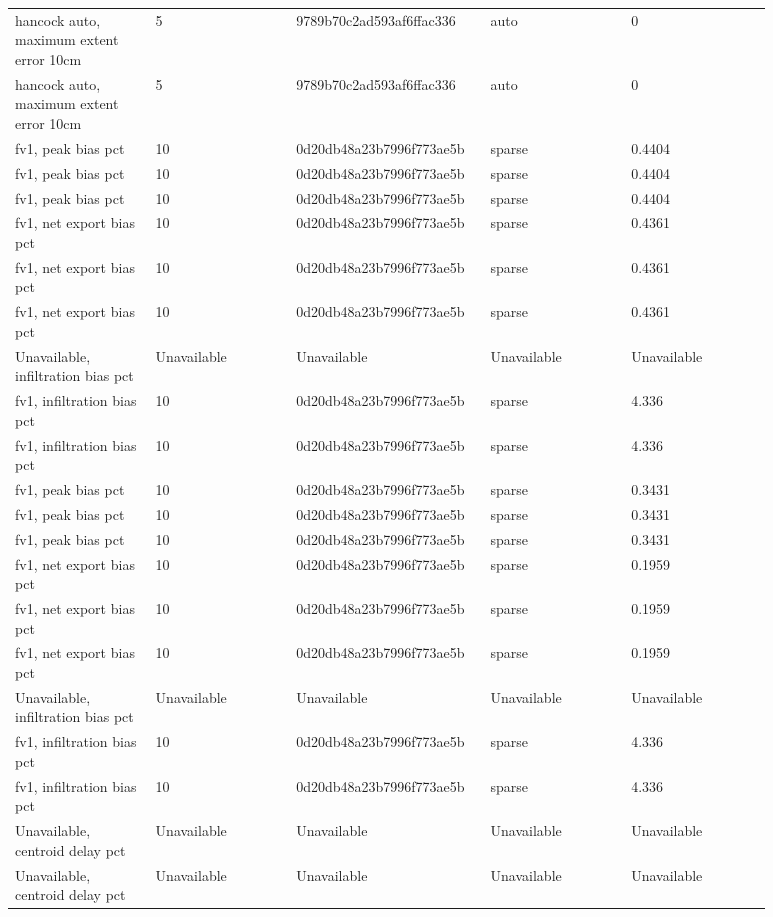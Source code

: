 \begin{longtable}{p{0.1760\linewidth}p{0.1760\linewidth}p{0.1760\linewidth}p{0.1760\linewidth}p{0.1760\linewidth}}
hancock auto, maximum extent error 10cm & 5 & 9789b70c2ad593af6ffac336 & auto & 0 \\
hancock auto, maximum extent error 10cm & 5 & 9789b70c2ad593af6ffac336 & auto & 0 \\
fv1, peak bias pct & 10 & 0d20db48a23b7996f773ae5b & sparse & 0.4404 \\
fv1, peak bias pct & 10 & 0d20db48a23b7996f773ae5b & sparse & 0.4404 \\
fv1, peak bias pct & 10 & 0d20db48a23b7996f773ae5b & sparse & 0.4404 \\
fv1, net export bias pct & 10 & 0d20db48a23b7996f773ae5b & sparse & 0.4361 \\
fv1, net export bias pct & 10 & 0d20db48a23b7996f773ae5b & sparse & 0.4361 \\
fv1, net export bias pct & 10 & 0d20db48a23b7996f773ae5b & sparse & 0.4361 \\
Unavailable, infiltration bias pct & Unavailable & Unavailable & Unavailable & Unavailable \\
fv1, infiltration bias pct & 10 & 0d20db48a23b7996f773ae5b & sparse & 4.336 \\
fv1, infiltration bias pct & 10 & 0d20db48a23b7996f773ae5b & sparse & 4.336 \\
fv1, peak bias pct & 10 & 0d20db48a23b7996f773ae5b & sparse & 0.3431 \\
fv1, peak bias pct & 10 & 0d20db48a23b7996f773ae5b & sparse & 0.3431 \\
fv1, peak bias pct & 10 & 0d20db48a23b7996f773ae5b & sparse & 0.3431 \\
fv1, net export bias pct & 10 & 0d20db48a23b7996f773ae5b & sparse & 0.1959 \\
fv1, net export bias pct & 10 & 0d20db48a23b7996f773ae5b & sparse & 0.1959 \\
fv1, net export bias pct & 10 & 0d20db48a23b7996f773ae5b & sparse & 0.1959 \\
Unavailable, infiltration bias pct & Unavailable & Unavailable & Unavailable & Unavailable \\
fv1, infiltration bias pct & 10 & 0d20db48a23b7996f773ae5b & sparse & 4.336 \\
fv1, infiltration bias pct & 10 & 0d20db48a23b7996f773ae5b & sparse & 4.336 \\
Unavailable, centroid delay pct & Unavailable & Unavailable & Unavailable & Unavailable \\
Unavailable, centroid delay pct & Unavailable & Unavailable & Unavailable & Unavailable \\

\end{longtable}
